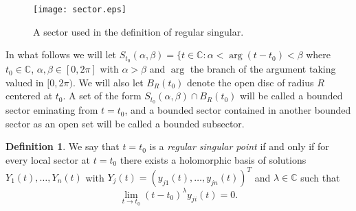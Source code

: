 \documentclass[12pt]{book}
\numberwithin{equation}{section}
\theoremstyle{definition}
\newtheorem{definition}[theorem]{Definition}
\theoremstyle{remark}
\newcommand{\CC}{\mathbb{C}}
\newcommand{\hol}{\operatorname{Hol}}
\begin{document}
\begin{figure}[h]
	\begin{center}
	\texttt{[image: sector.eps]}
	\end{center}
	\caption{A sector used in the definition of regular singular. }
\end{figure}

In what follows we will let $S_{t_0}(\alpha,\beta) = \lbrace t \in \CC : \alpha<\arg(t-t_0) <\beta$ where $t_0 \in \CC$, $\alpha,\beta \in [0,2\pi]$ with $\alpha>\beta$ and $\arg$ the branch of the argument taking valued in $[0,2\pi)$.
We will also let $B_R(t_0)$ denote the open disc of radius $R$ centered at $t_0$.
A set of the form $S_{t_0}(\alpha,\beta) \cap B_R(t_0)$ will be called a bounded sector eminating from $t=t_0$, and a bounded sector contained in another bounded sector as an open set will be called a bounded subsector.
\iffalse 
\begin{definition}
Let $S = S_{t_0}(\alpha,\beta) \cap B_R(t_0)$ be a sector of bounded radius eminating from $t_0$ (which is by definition open and doesn't contain $t_0$).
We say that a matrix $\Phi(t) \in M_{m,n}(\hol(S))$ is \emph{regular singular at $t_0$} if and only if for all subsectors $S' \subset S$ of strictly smaller radius and angle there exists some integer $m$ such that 
 $$ \lim_{t \to t_0, t\in S'} \Vert \Phi(t) \Vert  = O( \vert t-t_0 \vert^{-m}).$$
 \end{definition}
\fi

\begin{definition}
	We say that $t=t_0$ is a \emph{regular singular point} if and only if  for every local sector at $t=t_0$ there exists a holomorphic basis of solutions $Y_1(t),\ldots,Y_n(t)$ with $Y_j(t)=(y_{j1}(t),\ldots,y_{jn}(t))^T$ and $\lambda \in \CC$ such that 
	$$ \lim_{t\to t_0} (t-t_0)^{\lambda} y_{ji}(t) =0. $$
\end{definition}
\end{document}
